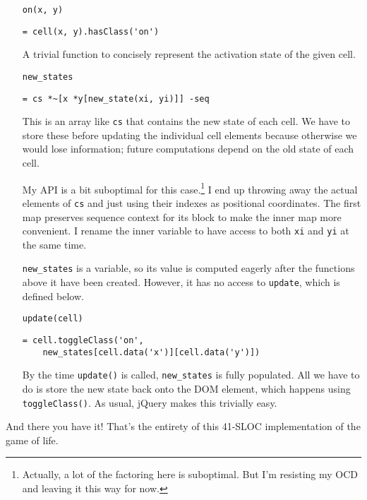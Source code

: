 \documentclass{report}
\begin{document}
\begin{enumerate}
\item[{\tt on(x, y)}]
\begin{verbatim}
= cell(x, y).hasClass('on')
\end{verbatim}

  A trivial function to concisely represent the activation state of the given cell.

\item[{\tt new\_states}]
\begin{verbatim}
= cs *~[x *y[new_state(xi, yi)]] -seq
\end{verbatim}

  This is an array like {\tt cs} that contains the new state of each cell. We have to store these before updating the individual cell elements because otherwise we would lose
  information; future computations depend on the old state of each cell.

  My API is a bit suboptimal for this case.\footnote{Actually, a lot of the factoring here is suboptimal. But I'm resisting my OCD and leaving it this way for now.} I end up throwing
  away the actual elements of {\tt cs} and just using their indexes as positional coordinates. The first map preserves sequence context for its block to make the inner map more
  convenient. I rename the inner variable to have access to both {\tt xi} and {\tt yi} at the same time.

  {\tt new\_states} is a variable, so its value is computed eagerly after the functions above it have been created. However, it has no access to {\tt update}, which is defined below.

\item[{\tt update(cell)}]
\begin{verbatim}
= cell.toggleClass('on',
    new_states[cell.data('x')][cell.data('y')])
\end{verbatim}

  By the time {\tt update()} is called, {\tt new\_states} is fully populated. All we have to do is store the new state back onto the DOM element, which happens using {\tt
  toggleClass()}. As usual, jQuery makes this trivially easy.
\end{enumerate}

      And there you have it! That's the entirety of this 41-SLOC implementation of the game of life.
\end{document}
